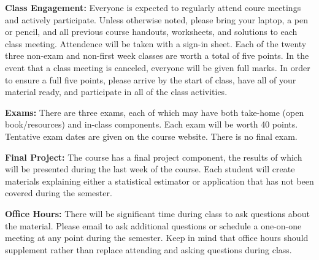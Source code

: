 \documentclass[11pt, a4paper]{article}
\begin{document}
\textbf{Class Engagement:}
Everyone is expected to regularly attend coure meetings and actively
participate. Unless otherwise noted, please bring your laptop, a pen
or pencil, and all previous course handouts, worksheets, and solutions
to each class meeting. Attendence will be taken with a sign-in sheet.
Each of the twenty three non-exam and non-first week classes are worth
a total of five points. In the event that a class meeting is canceled,
everyone will be given full marks. In order to ensure a full five points,
please arrive by the start of class, have all of your material ready, and
participate in all of the class activities.

\bigskip

\textbf{Exams:}
There are three exams, each of which may have both take-home
(open book/resources) and in-class components. Each exam will be
worth 40 points. Tentative exam dates are given on the course
website. There is no final exam.

\bigskip

\textbf{Final Project:}
The course has a final project component, the results of which will
be presented during the last week of the course. Each student will
create materials explaining either a statistical estimator or application
that has not been covered during the semester. 

\bigskip

\textbf{Office Hours:}
There will be significant time during class to ask questions about
the material. Please email to ask additional questions or schedule a
one-on-one meeting at any point during the semester. Keep in
mind that office hours should supplement rather than replace
attending and asking questions during class.
\end{document}
